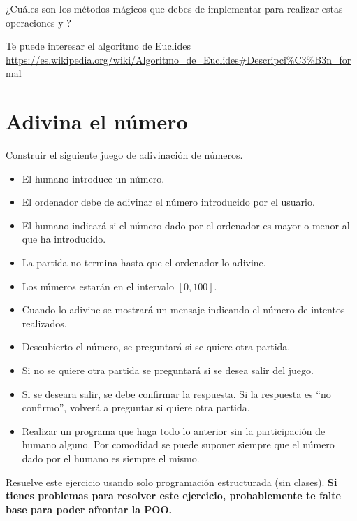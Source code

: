 ¿Cuáles son los métodos mágicos que debes de implementar para realizar estas operaciones  y ?

Te puede interesar el algoritmo de Euclides \url{https://es.wikipedia.org/wiki/Algoritmo_de_Euclides#Descripci%C3%B3n_formal}





 
\separacion
\section{Adivina el número}



Construir el siguiente juego de adivinación de números. 


\begin{itemize}%
\item El humano  introduce un número.
\item El ordenador debe de adivinar el número introducido por el usuario.
\item El humano indicará si el número dado por el ordenador es mayor o menor al que ha introducido.
\item La partida no termina hasta que el ordenador lo adivine.
\item Los números estarán en el intervalo $[0, 100]$.
\item Cuando lo adivine se mostrará un mensaje indicando el número de intentos realizados.
\item Descubierto el número, se preguntará si se quiere  otra partida.
\item Si no se quiere  otra partida se preguntará si se desea salir del juego.
\item Si se deseara salir, se debe confirmar la respuesta. Si la respuesta es ``no confirmo'', volverá a preguntar si quiere otra partida.
\item Realizar un programa que haga todo  lo anterior sin la participación de humano alguno. Por comodidad se puede suponer siempre que el número dado por el humano es siempre el mismo.
\end{itemize}

Resuelve este ejercicio usando solo programación estructurada (sin clases). 
\textbf{Si tienes problemas para resolver este ejercicio, probablemente te falte base para poder afrontar la POO.}





